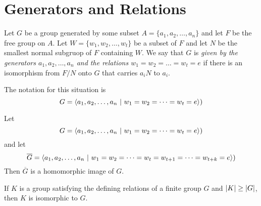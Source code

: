 \section{Generators and Relations}

\begin{definition}
	Let $G$ be a group generated by some subset $A=\{a_1,a_2,\dots,a_n\}$ and let $F$ be the free group on $A$. Let $W = \{w_1,w_2,\dots,w_t\}$ be a subset of $F$ and let $N$ be the smallest normal subgruop of $F$ containing $W$. We say that $G$ is \textit{given by the generators $a_1,a_2,\dots,a_n$ and the relations $w_1=w_2=\dots=w_t=e$} if there is an isomorphism from $F/N$ onto $G$ that carries $a_iN$ to $a_i$.

	\noindent The notation for this situation is
	\[ G = \lr{a_1,a_2,\dots,a_n\ \vert\ w_1=w_2=\dots=w_t=e} \]
\end{definition}

\begin{theorem}
	Let
	\[ G = \lr{a_1,a_2,\dots,a_n\ \vert\ w_1=w_2=\dots=w_t=e} \]
	and let
	\[ \overline{G}=\lr{a_1,a_2,\dots,a_n\ \vert\ w_1=w_2=\dots=w_t=w_{t+1}=\dots=w_{t+k}=e} \]
	Then $\overline{G}$ is a homomorphic image of $G$.
\end{theorem}

\begin{corollary}
	If $K$ is a group satisfying the defining relations of a finite group $G$ and $\left\lvert K \right\rvert \geq \left\lvert G \right\rvert$, then $K$ is isomorphic to $G$.
\end{corollary}
